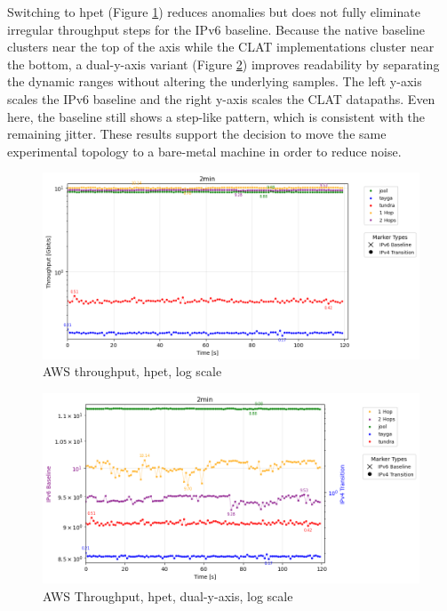Switching to hpet (Figure \ref{fig:AWS_tcp_sameScale_hpet_log}) reduces anomalies but does not fully eliminate irregular throughput steps for the IPv6 baseline. Because the native baseline clusters near the top of the axis while the CLAT implementations cluster near the bottom, a dual-y-axis variant (Figure \ref{fig:AWS_tcp_dualAxis_hpet_log}) improves readability by separating the dynamic ranges without altering the underlying samples. The left y-axis scales the IPv6 baseline and the right y-axis scales the CLAT datapaths. Even here, the baseline still shows a step-like pattern, which is consistent with the remaining jitter. These results support the decision to move the same experimental topology to a bare-metal machine in order to reduce noise.


\begin{figure}[H]
    \centering
    \includegraphics[width=1\textwidth]{resources/finalPlots/combinedplots/AWS_tcp_sameScale_hpet_2min_log.png}
    \caption{AWS throughput, hpet, log scale}
    \label{fig:AWS_tcp_sameScale_hpet_log}

\end{figure}


\begin{figure}[H]
    \centering
    \includegraphics[width=1\textwidth]{resources/finalPlots/Jitterplots/AWS_tcp_dualAxis_hpet_2min_log.png}
    \caption{AWS Throughput, hpet, dual-y-axis, log scale}
    \label{fig:AWS_tcp_dualAxis_hpet_log}
\end{figure}



